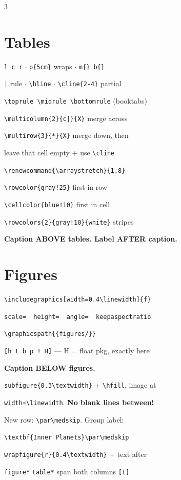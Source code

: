 \documentclass[a4paper]{article}
\newcommand{\C}[1]{\texttt{\footnotesize #1}}
\begin{document}
{\begin{multicols}{3}
\section{Tables}
\C{l c r} $\cdot$ \C{p\{5cm\}} wraps $\cdot$ \C{m\{\} b\{\}}\par
\C{|} rule $\cdot$ \C{\textbackslash hline} $\cdot$ \C{\textbackslash cline\{2-4\}} partial\par
\C{\textbackslash toprule \textbackslash midrule \textbackslash bottomrule} (booktabs)\par
\C{\textbackslash multicolumn\{2\}\{c|\}\{X\}} merge across\par
\C{\textbackslash multirow\{3\}\{*\}\{X\}} merge down, then\par
\quad leave that cell empty + use \C{\textbackslash cline}\par
\C{\textbackslash renewcommand\{\textbackslash arraystretch\}\{1.8\}}\par
\C{\textbackslash rowcolor\{gray!25\}} first in row\par
\C{\textbackslash cellcolor\{blue!10\}} first in cell\par
\C{\textbackslash rowcolors\{2\}\{gray!10\}\{white\}} stripes\par
\textbf{Caption ABOVE tables. Label AFTER caption.}

\section{Figures}
\C{\textbackslash includegraphics[width=0.4\textbackslash linewidth]\{f\}}\par
\C{scale= \ height= \ angle= \ keepaspectratio}\par
\C{\textbackslash graphicspath\{\{figures/\}\}}\par
\C{[h t b p ! H]} --- H = float pkg, exactly here\par
\textbf{Caption BELOW figures.}\par
\C{subfigure\{0.3\textbackslash textwidth\}} + \C{\textbackslash hfill}, image at\par
\quad \C{width=\textbackslash linewidth}. \textbf{No blank lines between!}\par
New row: \C{\textbackslash par\textbackslash medskip}. Group label:\par
\quad \C{\textbackslash textbf\{Inner Planets\}\textbackslash par\textbackslash medskip}\par
\C{wrapfigure\{r\}\{0.4\textbackslash textwidth\}} + text after\par
\C{figure*} \C{table*} span both columns \C{[t]}


\end{multicols}}
\end{document}
